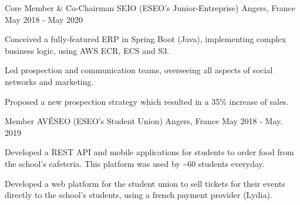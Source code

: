 

\begin{cventries}

  \cventry
    {Core Member \& Co-Chairman} %
    {SEIO (ESEO's Junior-Entreprise)} %
    {Angers, France} %
    {May 2018 - May 2020} %
    {
      \begin{cvitems} %
        \item {Conceived a fully-featured ERP in Spring Boot (Java), implementing complex business logic, using AWS ECR, ECS and S3.}
        \item {Led prospection and communication teams, overseeing all aspects of social networks and marketing.}
        \item {Proposed a new prospection strategy which resulted in a 35\% increase of sales.}
      \end{cvitems}
    }

  \cventry
    {Member} %
    {AVÉSEO (ESEO's Student Union)} %
    {Angers, France} %
    {May 2018 - May. 2019} %
    {
      \begin{cvitems} %
        \item {Developed a REST API and mobile applications for students to order food from the school's cafeteria. This platform was used by \textasciitilde60 students everyday.}
        \item {Developed a web platform for the student union to sell tickets for their events directly to the school's students, using a french payment provider (Lydia).}
      \end{cvitems}
    }

\end{cventries}
